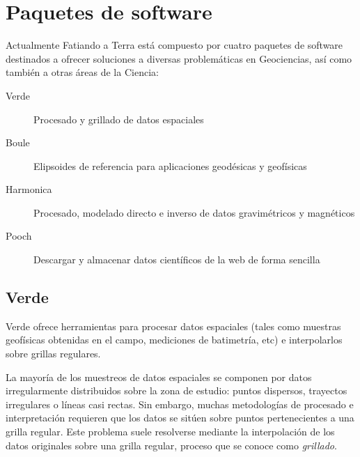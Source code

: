 \section{Paquetes de software}

Actualmente Fatiando a Terra está compuesto por cuatro paquetes de software
destinados a ofrecer soluciones a diversas problemáticas en Geociencias, así
como también a otras áreas de la Ciencia:

\begin{description}
    \item[Verde]{%
        Procesado y grillado de datos espaciales
    }
    \item[Boule]{%
        Elipsoides de referencia para aplicaciones geodésicas y geofísicas
    }
    \item[Harmonica]{%
        Procesado, modelado directo e inverso de datos gravimétricos
        y magnéticos
    }
    \item[Pooch]{%
        Descargar y almacenar datos científicos de la web de forma sencilla
    }
\end{description}

\subsection{Verde}

Verde ofrece herramientas para procesar datos espaciales (tales como
muestras geofísicas obtenidas en el campo, mediciones de batimetría, etc)
e interpolarlos sobre grillas regulares.

La mayoría de los muestreos de datos espaciales se componen por datos
irregularmente distribuidos sobre la zona de estudio:
puntos dispersos, trayectos irregulares o líneas casi rectas.
Sin embargo, muchas metodologías de procesado e interpretación requieren que
los datos se sitúen sobre puntos pertenecientes a una grilla regular.
Este problema suele resolverse mediante la interpolación de los datos
originales sobre una grilla regular, proceso que se conoce como
\emph{grillado}.

